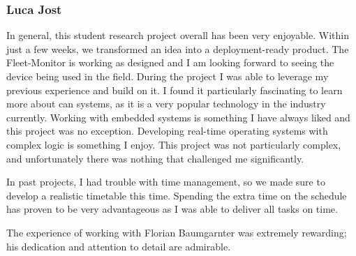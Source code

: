 \subsubsection{Luca Jost}
In general, this student research project overall has been very enjoyable. Within just a few weeks, we transformed an idea into a deployment-ready product. The Fleet-Monitor is working as designed and I am looking forward to seeing the device being used in the field. During the project I was able to leverage my previous experience and build on it. I found it particularly fascinating to learn more about \acrshort{can} systems, as it is a very popular technology in the industry currently. Working with embedded systems is something I have always liked and this project was no exception. Developing real-time operating systems with complex logic is something I enjoy. This project was not particularly complex, and unfortunately there was nothing that challenged me significantly.

In past projects, I had trouble with time management, so we made sure to develop a realistic timetable this time. Spending the extra time on the schedule has proven to be very advantageous as I was able to deliver all tasks on time. 

The experience of working with Florian Baumgarnter was extremely rewarding; his dedication and attention to detail are admirable.